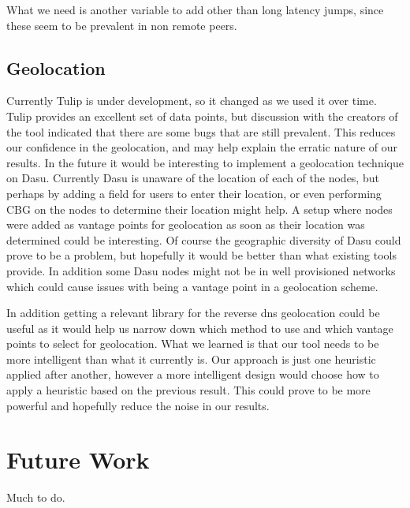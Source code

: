 \documentclass{acm_proc_article-sp}
\begin{document}
What we need is another variable to add other than long latency jumps, since these seem to be prevalent in non remote peers.
\subsection{Geolocation}
Currently Tulip is under development, so it changed as we used it over time. Tulip provides an excellent set of data points, but discussion with the creators of the tool indicated that there are some bugs that 
are still prevalent. This reduces our confidence in the geolocation, and may help explain the erratic nature of our results. In the future it would be interesting to implement a geolocation 
technique on Dasu. Currently Dasu is unaware of the location of each of the nodes, but perhaps by adding a field for users to enter their location, or even performing CBG on the nodes to determine their location might help.
A setup where nodes were added as vantage points for geolocation as soon as their location was determined could be interesting. Of course the geographic diversity of Dasu could prove to be a problem, but hopefully it would
be better than what existing tools provide. In addition some Dasu nodes might not be in well provisioned networks which could cause issues with being a vantage point in a geolocation scheme. 

In addition getting a relevant library for the reverse dns geolocation could be useful as it would help
us narrow down which method to use and which vantage points to select for geolocation.
What we learned is that our tool needs to be more intelligent than what it currently is. Our approach is just one heuristic applied after another, however a more intelligent design would
choose how to apply a heuristic based on the previous result. This could prove to be more powerful and hopefully reduce the noise in our results.

\section{Future Work}
\label{sec:future}
Much to do.



\end{document}
